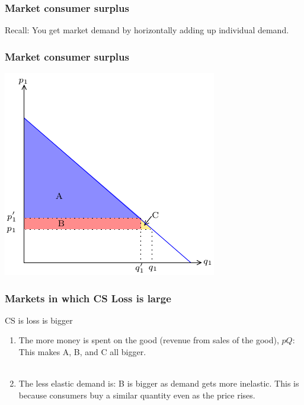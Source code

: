 \documentclass[xcolor=pdftex,dvipsnames]{beamer}
\begin{document}
\begin{frame}
\frametitle{Market consumer surplus}
Recall: You get market demand by horizontally adding up individual
demand.

\bigskip
{}
\end{frame}






\begin{frame}
\frametitle{Market consumer surplus}
\begin{center}\includegraphics{pics/MarketCS}
\end{center}
\end{frame}




\begin{frame}
\frametitle{Markets in which CS Loss is large}
CS is loss is bigger 
\begin{enumerate}[<+->]
\item The more money is spent on the good (revenue from sales of
  the good), $pQ$: This makes A, B, and C all bigger. \\ \
\item The less elastic demand is: B is bigger as demand gets more
  inelastic. This is because consumers buy a similar quantity even as
  the price rises.
\end{enumerate}
\end{frame}
\end{document}
